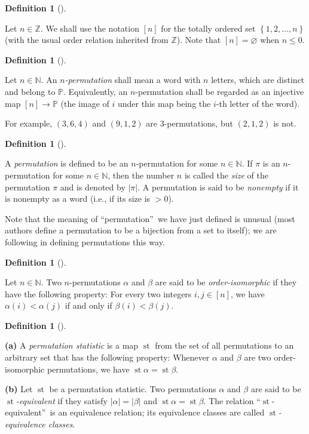 \documentclass[numbers=enddot,12pt,final,onecolumn,notitlepage]{scrartcl}%
\theoremstyle{definition}
\newtheorem{defi}[theo]{Definition}
\newenvironment{definition}[1][]
{\begin{defi}[#1]\begin{leftbar}}
{\end{leftbar}\end{defi}}
\begin{document}
\begin{definition}
Let $n\in\mathbb{Z}$. We shall use the notation $\left[  n\right]  $ for the
totally ordered set $\left\{  1,2,\ldots,n\right\}  $ (with the usual order
relation inherited from $\mathbb{Z}$). Note that $\left[  n\right]
=\varnothing$ when $n\leq0$.
\end{definition}

\begin{definition}
\label{def.perm}Let $n\in\mathbb{N}$. An $n$\textit{-permutation} shall mean a
word with $n$ letters, which are distinct and belong to $\mathbb{P}$.
Equivalently, an $n$-permutation shall be regarded as an injective map
$\left[  n\right]  \rightarrow\mathbb{P}$ (the image of $i$ under this map
being the $i$-th letter of the word).
\end{definition}

For example, $\left(  3,6,4\right)  $ and $\left(  9,1,2\right)  $ are
$3$-permutations, but $\left(  2,1,2\right)  $ is not.

\begin{definition}
A \textit{permutation} is defined to be an $n$-permutation for some
$n\in\mathbb{N}$. If $\pi$ is an $n$-permutation for some $n\in\mathbb{N}$,
then the number $n$ is called the \textit{size} of the
permutation $\pi$ and is denoted by $\left\vert \pi\right\vert $. A
permutation is said to be \textit{nonempty} if it is nonempty as a word (i.e.,
if its size is $>0$).
\end{definition}

Note that the meaning of \textquotedblleft permutation\textquotedblright\ we
have just defined is unusual (most authors define a permutation to be a
bijection from a set to itself); we are following \cite{part1} in defining
permutations this way.

\begin{definition}
Let $n\in\mathbb{N}$. Two $n$-permutations $\alpha$ and $\beta$ are said to be
\textit{order-isomorphic} if they have the following property: For every two
integers $i,j\in\left[  n\right]  $, we have $\alpha\left(  i\right)
<\alpha\left(  j\right)  $ if and only if $\beta\left(  i\right)
<\beta\left(  j\right)  $.
\end{definition}

\begin{definition}
\textbf{(a)} A \textit{permutation statistic} is a map $\operatorname{st}$
from the set of all permutations to an arbitrary set that has the following
property: Whenever $\alpha$ and $\beta$ are two order-isomorphic permutations,
we have $\operatorname{st} \alpha = \operatorname{st} \beta$.

\textbf{(b)} Let $\operatorname{st}$ be a permutation statistic. Two
permutations $\alpha$ and $\beta$ are said to be
$\operatorname{st}$\textit{-equivalent} if they satisfy
$\left\vert \alpha\right\vert = \left\vert \beta\right\vert $ and
$\operatorname{st}\alpha = \operatorname{st}\beta$.
The relation
\textquotedblleft$\operatorname{st}$-equivalent\textquotedblright\ is
an equivalence relation; its equivalence
classes are called $\operatorname{st}$\textit{-equivalence classes}.
\end{definition}
\end{document}
